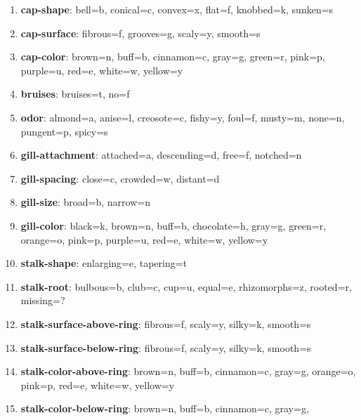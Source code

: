 \documentclass[10pt,letterpaper]{article}
\begin{document}
\begin{enumerate}
    \item \textbf{cap-shape}:
        bell=b,
        conical=c,
        convex=x,
        flat=f,
        knobbed=k,
        sunken=s
    \item \textbf{cap-surface}:
        fibrous=f,
        grooves=g,
        scaly=y,
        smooth=s
    \item \textbf{cap-color}:
        brown=n,
        buff=b,
        cinnamon=c,
        gray=g,
        green=r,
        pink=p,
        purple=u,
        red=e,
        white=w,
        yellow=y
    \item \textbf{bruises}:
        bruises=t,
        no=f
    \item \textbf{odor}:
        almond=a,
        anise=l,
        creosote=c,
        fishy=y,
        foul=f,
        musty=m,
        none=n,
        pungent=p,
        spicy=s
    \item \textbf{gill-attachment}:
        attached=a,
        descending=d,
        free=f,
        notched=n
    \item \textbf{gill-spacing}:
        close=c,
        crowded=w,
        distant=d
    \item \textbf{gill-size}:
        broad=b,
        narrow=n
    \item \textbf{gill-color}:
        black=k,
        brown=n,
        buff=b,
        chocolate=h,
        gray=g,
        green=r,
        orange=o,
        pink=p,
        purple=u,
        red=e,
        white=w,
        yellow=y
    \item \textbf{stalk-shape}:
        enlarging=e,
        tapering=t
    \item \textbf{stalk-root}:
        bulbous=b,
        club=c,
        cup=u,
        equal=e,
        rhizomorphs=z,
        rooted=r,
        missing=?
    \item \textbf{stalk-surface-above-ring}:
        fibrous=f,
        scaly=y,
        silky=k,
        smooth=s
    \item \textbf{stalk-surface-below-ring}:
        fibrous=f,
        scaly=y,
        silky=k,
        smooth=s
    \item \textbf{stalk-color-above-ring}:
        brown=n,
        buff=b,
        cinnamon=c,
        gray=g,
        orange=o,
        pink=p,
        red=e,
        white=w,
        yellow=y
    \item \textbf{stalk-color-below-ring}:
        brown=n,
        buff=b,
        cinnamon=c,
        gray=g,

\end{enumerate}
\end{document}
